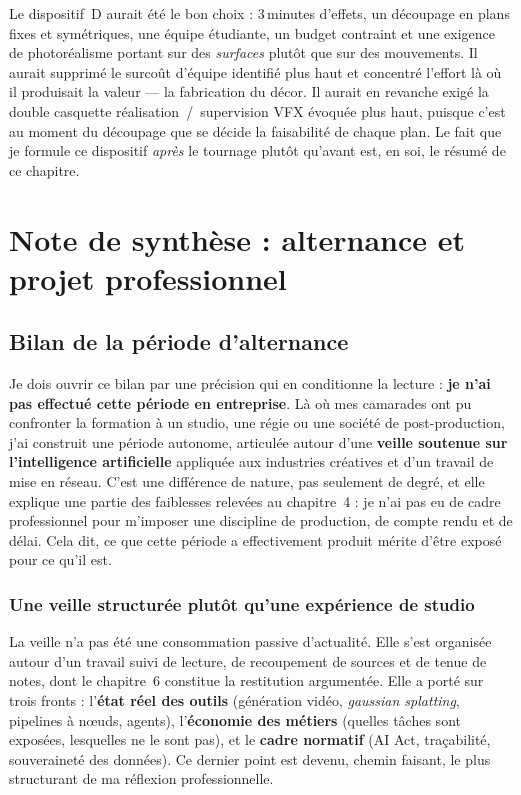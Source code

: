 \documentclass[11pt,a4paper]{report}
\begin{document}
\begin{infobox}[title={Verdict pour un projet comme \textit{NoClip}}]
Le dispositif~D aurait été le bon choix : 3\,minutes d'effets, un découpage en plans fixes et
symétriques, une équipe étudiante, un budget contraint et une exigence de photoréalisme portant
sur des \emph{surfaces} plutôt que sur des mouvements. Il aurait supprimé le surcoût d'équipe
identifié plus haut et concentré l'effort là où il produisait la valeur --- la fabrication du décor.
Il aurait en revanche exigé la double casquette réalisation~/~supervision VFX évoquée plus haut,
puisque c'est au moment du découpage que se décide la faisabilité de chaque plan. Le fait que
je formule ce dispositif \emph{après} le tournage plutôt qu'avant est, en soi, le résumé de ce
chapitre.
\end{infobox}

\chapter{Note de synthèse : alternance et projet professionnel}

\section{Bilan de la période d'alternance}
Je dois ouvrir ce bilan par une précision qui en conditionne la lecture : \textbf{je n'ai pas
effectué cette période en entreprise}. Là où mes camarades ont pu confronter la formation à un
studio, une régie ou une société de post-production, j'ai construit une période autonome,
articulée autour d'une \textbf{veille soutenue sur l'intelligence artificielle} appliquée aux
industries créatives et d'un travail de mise en réseau. C'est une différence de nature, pas
seulement de degré, et elle explique une partie des faiblesses relevées au chapitre~4 : je n'ai
pas eu de cadre professionnel pour m'imposer une discipline de production, de compte rendu et
de délai. Cela dit, ce que cette période a effectivement produit mérite d'être exposé pour ce
qu'il est.

\subsection{Une veille structurée plutôt qu'une expérience de studio}
La veille n'a pas été une consommation passive d'actualité. Elle s'est organisée autour d'un
travail suivi de lecture, de recoupement de sources et de tenue de notes, dont le chapitre~6
constitue la restitution argumentée. Elle a porté sur trois fronts : l'\textbf{état réel des outils}
(génération vidéo, \emph{gaussian splatting}, pipelines à n\oe uds, agents), l'\textbf{économie des
métiers} (quelles tâches sont exposées, lesquelles ne le sont pas), et le \textbf{cadre normatif}
(AI Act, traçabilité, souveraineté des données). Ce dernier point est devenu, chemin faisant, le
plus structurant de ma réflexion professionnelle.
\end{document}
